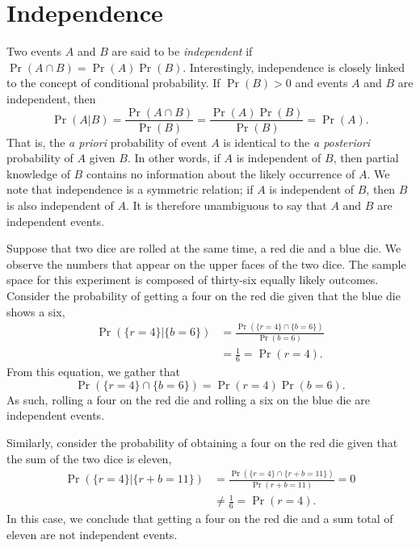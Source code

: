 \section{Independence}
\label{section:Independence}

Two events $A$ and $B$ are said to be \emph{independent} if $\Pr (A \cap B) = \Pr(A) \Pr(B)$. 
Interestingly, independence is closely linked to the concept of conditional probability.
If $\Pr(B) > 0$ and events $A$ and $B$ are independent, then
\begin{equation*}
\Pr (A | B) = \frac{ \Pr (A \cap B) }{\Pr (B)}
= \frac{ \Pr (A) \Pr(B) }{\Pr (B)}
= \Pr (A).
\end{equation*}
That is, the \emph{a priori} probability of event $A$ is identical to the \emph{a posteriori} probability of $A$ given $B$.
In other words, if $A$ is independent of $B$, then partial knowledge of $B$ contains no information about the likely occurrence of $A$.
We note that independence is a symmetric relation; if $A$ is independent of $B$, then $B$ is also independent of $A$.
It is therefore unambiguous to say that $A$ and $B$ are independent events.

\begin{example}
Suppose that two dice are rolled at the same time, a red die and a blue die.
We observe the numbers that appear on the upper faces of the two dice.
The sample space for this experiment is composed of thirty-six equally likely outcomes.
Consider the probability of getting a four on the red die given that the blue die shows a six,
\begin{equation*}
\begin{split}
\Pr (\{ r=4 \} | \{ b=6 \})
&= \frac{ \Pr (\{ r=4 \} \cap \{ b=6 \}) }
{ \Pr ( b=6 ) } \\
&= \frac{1}{6} = \Pr ( r=4 ) .
\end{split}
\end{equation*}
From this equation, we gather that
\begin{equation*}
\Pr (\{ r=4 \} \cap \{ b=6 \})
= \Pr ( r=4 ) \Pr ( b=6 ) .
\end{equation*}
As such, rolling a four on the red die and rolling a six on the blue die are independent events.

Similarly, consider the probability of obtaining a four on the red die given that the sum of the two dice is eleven,
\begin{equation*}
\begin{split}
\Pr (\{ r=4 \} | \{ r+b=11 \})
&= \frac{ \Pr (\{ r=4 \} \cap \{ r+b=11 \}) }
{ \Pr ( r+b=11 ) } = 0 \\
&\neq \frac{1}{6} = \Pr ( r=4 ) .
\end{split}
\end{equation*}
In this case, we conclude that getting a four on the red die and a sum total of eleven are not independent events.
\end{example}

